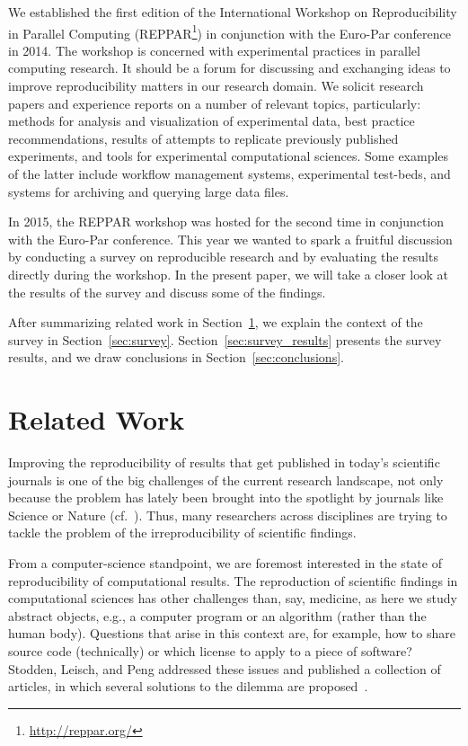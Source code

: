 \documentclass{article}\usepackage[]{graphicx}\usepackage[]{color}
\makeatletter
\newcommand{\Sec}{Section\xspace}
\newcommand{\eg}{e.g.\xspace}
\newcommand{\cf}{cf.\@\xspace}
\newcommand{\reppar}{REPPAR\xspace}
\newcommand{\europar}{Euro-Par\xspace}
\makeatother
\begin{document}
We established the first edition of the International Workshop on
Reproducibility in Parallel Computing
(\reppar\footnote{\url{http://reppar.org/}}) in conjunction with the
\europar conference in 2014.  The workshop is concerned with
experimental practices in parallel computing research.  It should be a
forum for discussing and exchanging ideas to improve reproducibility
matters in our research domain. We solicit research papers and
experience reports on a number of relevant topics, particularly:
methods for analysis and visualization of experimental data, best
practice recommendations, results of attempts to replicate previously
published experiments, and tools for experimental computational
sciences. Some examples of the latter include workflow management
systems, experimental test-beds, and systems for archiving and
querying large data files.

In 2015, the \reppar workshop was hosted for the second time in
conjunction with the \europar conference. This year we wanted to spark
a fruitful discussion by conducting a survey on reproducible research
and by evaluating the results directly during the workshop.
In the present paper, we will take a closer look at the results of the
survey and discuss some of the 
findings.

After summarizing related work in \Sec~\ref{sec:rel_work}, we explain
the context of the survey in \Sec~\ref{sec:survey}.
\Sec~\ref{sec:survey_results} presents the survey results, and we draw
conclusions in \Sec~\ref{sec:conclusions}.

\section{Related Work}
\label{sec:rel_work}

Improving the reproducibility of results that get published in today's
scientific journals is one of the big challenges of the current
research landscape, not only because the problem has lately been
brought into the spotlight by journals like Science or Nature
(\cf~\cite{Nature2013,Buck_Science}). Thus, many researchers across
disciplines are trying to tackle the problem of the irreproducibility
of scientific findings.

From a computer-science standpoint, we are foremost interested in the
state of reproducibility of computational results. The reproduction of
scientific findings in computational sciences has other challenges
than, say, medicine, as here we study abstract objects, \eg, a
computer program or an algorithm (rather than the human
body). Questions that arise in this context are, for example, how to
share source code (technically) or which license to apply to a piece
of software?  Stodden, Leisch, and Peng addressed these issues and
published a collection of articles, in which several solutions to the
dilemma are proposed~\cite{stodden:implementing}.
\end{document}
